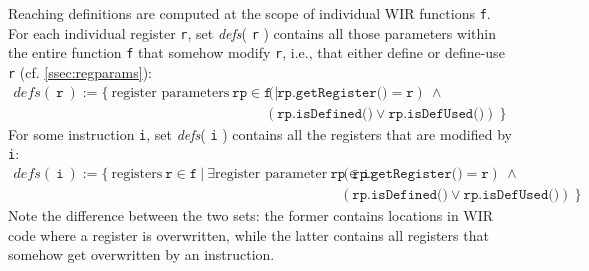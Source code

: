 Reaching definitions are computed at the scope of individual \gls{WIR} functions \texttt{f}.
For each individual register \texttt{r}, set \textit{defs}( \texttt{r} ) contains all those parameters within the entire function \texttt{f} that somehow modify \texttt{r}, i.e., that either define or define-use \texttt{r} (cf. \cref{ssec:regparams}):
\begin{equation}\label{eq:reachdef1}
  \begin{split}
    \textit{defs}(\ \texttt{r}\ ) := \{\ \text{register parameters}\ \texttt{rp} \in \texttt{f}\ \vert\ & (\texttt{rp.getRegister()} = \texttt{r})\ \wedge \\
                                                                                                        & (\texttt{rp.isDefined()} \vee \texttt{rp.isDefUsed()})\ \}
  \end{split}
\end{equation}
For some instruction \texttt{i}, set \textit{defs}( \texttt{i} ) contains all the registers that are modified by \texttt{i}:
\begin{equation}\label{eq:reachdef2}
  \begin{split}
    \textit{defs}(\ \texttt{i}\ ) := \{\ \text{registers}\ \texttt{r} \in \texttt{f}\ \vert\ \exists \text{register parameter}\ \texttt{rp} \in \texttt{i}:\ & (\texttt{rp.getRegister()} = \texttt{r})\ \wedge \\
                                                                                                                                                             & (\texttt{rp.isDefined()} \vee \texttt{rp.isDefUsed()})\ \}
  \end{split}
\end{equation}
Note the difference between the two sets: the former contains locations in \gls{WIR} code where a register is overwritten, while the latter contains all registers that somehow get overwritten by an instruction.

